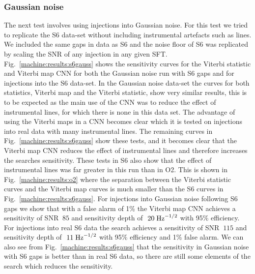 \subsubsection{Gaussian noise}

The next test involves using injections into Gaussian noise. For this test we tried to replicate the S6 data-set without including instrumental artefacts such as lines. We included the same gaps in data as S6 and the noise floor of S6 was replicated by scaling the \gls{SNR} of any injection in any given \gls{SFT}. 
Fig.~\ref{machine:results:s6gauss} shows the sensitivity curves for the Viterbi statistic and Viterbi map \gls{CNN} for both the Gaussian noise run with S6 gaps and for injections into the S6 data-set. 
In the Gaussian noise data-set the curves for both statistics, Viterbi map and the Viterbi statistic, show very similar results, this is to be expected as the main use of the \gls{CNN} was to reduce the effect of instrumental lines, for which there is none in this data set. 
The advantage of using the Viterbi maps in a \gls{CNN} becomes clear which it is tested on injections into real data with many instrumental lines. 
The remaining curves in Fig.~\ref{machine:results:s6gauss} show these tests, and it becomes clear that the Viterbi map \gls{CNN} reduces the effect of instrumental lines and therefore increases the searches sensitivity. 
These tests in S6 also show that the effect of instrumental lines was far greater in this run than in O2. 
This is shown in Fig.~\ref{machine:results:o2} where the separation between the Viterbi statistic curves and the Viterbi map curves is much smaller than the S6 curves in Fig.~\ref{machine:results:s6gauss}.
For injections into Gaussian noise following S6 gaps we show that with a false alarm of 1\% the Viterbi map \gls{CNN} achieves a sensitivity of SNR $~85$ and sensitivity depth of $~20\; {\rm Hz}^{-1/2}$ with 95\% efficiency. For injections into real S6 data the search achieves a sensitivity of SNR $~115$ and sensitivity depth of $~11\; {\rm Hz}^{-1/2}$ with 95\% efficiency and 1\% false alarm. We can also see from Fig.~\ref{machine:results:s6gauss} that the sensitivity in Gaussian noise with S6 gaps is better than in real S6 data, so there are still some elements of the search which reduces the sensitivity.

